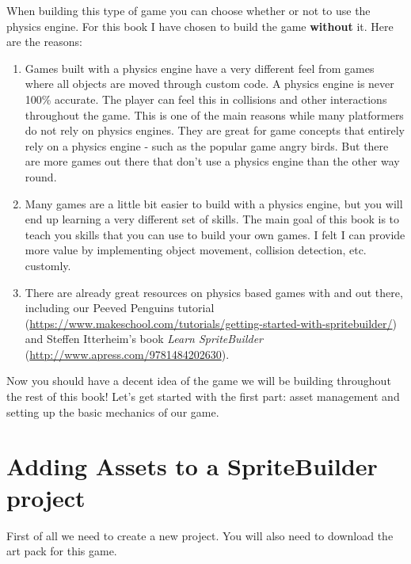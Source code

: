 When building this type of game you can choose whether or not to use the
\cocos{} physics engine. For this book I have chosen to build the game
\textbf{without} it. Here are the reasons:
\begin{enumerate}
  \item Games built with a physics engine have a very different feel from games
  where all objects are moved through custom code. A physics engine is never
  100\% accurate. The player can feel this in collisions and other interactions
  throughout the game. This is one of the main reasons while many platformers do
  not rely on physics engines. They are great for game concepts that entirely
  rely on a physics engine - such as the popular game angry birds. But there are
  more games out there that don't use a physics engine than the other way
  round.
  \item Many games are a little bit easier to build with a physics engine, but
  you will end up learning a very different set of skills. The main goal of this
  book is to teach you skills that you can use to build your own games. I felt I
  can provide more value by implementing object movement, collision detection,
  etc. customly.
  \item There are already great resources on physics based games with \SB{} and
  \cocos{} out there, including our Peeved Penguins tutorial
  (\url{https://www.makeschool.com/tutorials/getting-started-with-spritebuilder/}) and 
  Steffen Itterheim's book \textit{Learn SpriteBuilder}
  (\url{http://www.apress.com/9781484202630}).
\end{enumerate}

Now you should have a decent idea of the game we will be building throughout the
rest of this book! Let's get started with the first part: asset
management and setting up the basic mechanics of our game.

\section{Adding Assets to a SpriteBuilder project}
First of all we need to create a new \SB{} project. You will also need to
download the art pack for this game.

